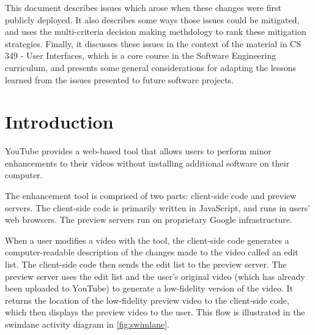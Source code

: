 \documentclass[se,resubmit]{uw-wkrpt}
\begin{document}
This document describes issues which arose when these changes were first
publicly deployed. It also describes some ways those issues could be mitigated,
and uses the multi-criteria decision making methdology to rank these mitigation
strategies. Finally, it discusses these issues in the context of the material in
CS 349 - User Interfaces, which is a core course in the Software Engineering
curriculum, and presents some general considerations for adapting the lessons
learned from the issues presented to future software projects.

\tableofcontents
\listoffigures
\listoftables

\mainmatter

\section{Introduction}\label{sec:intro}
YouTube provides a web-based tool that allows users to perform minor
enhancements to their videos without installing additional software on their
computer.

The enhancement tool is comprised of two parts: client-side code and preview
servers. The client-side code is primarily written in JavaScript, and runs in
users' web browsers. The preview servers run on proprietary Google
infrastructure.

When a user modifies a video with the tool, the client-side code generates a
computer-readable description of the changes made to the video called an edit
list. The client-side code then sends the edit list to the preview server. The
preview server uses the edit list and the user's original video (which has
already been uploaded to YouTube) to generate a low-fidelity version of the
video. It returns the location of the low-fidelity preview video to the
client-side code, which then displays the preview video to the user. This
flow is illustrated in the swimlane activity diagram in
\ref{fig:swimlane}.
\end{document}
